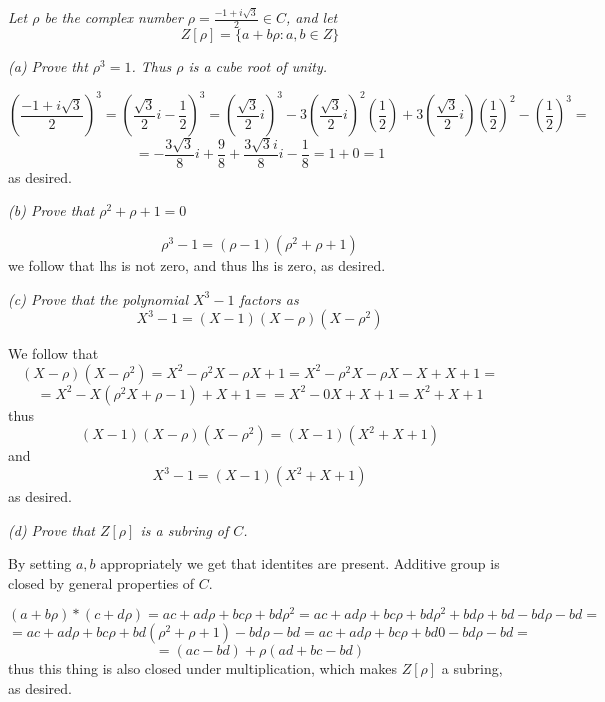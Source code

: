 \documentclass[11pt,oneside,titlepage]{book}
\newcommand{\set}[1]{\{ #1 \}}
\begin{document}
\subsection{}

\textit{Let $\rho$ be the complex number $\rho = \frac{-1 + i\sqrt{3}}{2} \in C$, and let
  $$Z[\rho] = \set{a + b\rho: a, b \in Z}$$}

\textit{(a) Prove tht $\rho^3 = 1$. Thus $\rho$ is a cube root of unity.}

$$\left(\frac{-1 + i\sqrt{3}}{2}\right)^3 =
\left(\frac{\sqrt{3}}{2} i - \frac{1}{2}\right)^3 =
\left(\frac{\sqrt{3}}{2} i \right)^3 -
3 \left(\frac{\sqrt{3}}{2} i \right)^2 \left(\frac{1}{2} \right) +
3 \left(\frac{\sqrt{3}}{2} i \right) \left(\frac{1}{2}\right)^2 -
\left(\frac{1}{2}\right)^3 = $$
$$ = - \frac{3 \sqrt{3}}{8} i  + \frac{9}{8} + \frac{3 \sqrt{3} i}{8}i  - \frac{1}{8} =
1 + 0 = 1$$
as desired.

\textit{(b) Prove that $\rho^2 + \rho + 1 = 0$}

$$\rho^3 - 1 = (\rho - 1)(\rho^2 + \rho + 1)$$
we follow that lhs is not zero, and thus lhs is zero, as desired.

\textit{(c) Prove that the polynomial $X^3 - 1$ factors as
  $$X^3 - 1 = (X - 1)(X - \rho)(X - \rho^2)$$}


We follow that
$$(X - \rho) (X - \rho^2) = X^2 - \rho^2 X - \rho X + 1 = X^2 - \rho^2 X - \rho X - X + X + 1 =$$
$$ = X^2 - X(\rho^2 X+ \rho - 1) + X + 1 = = X^2 - 0X + X + 1 = X^2 + X + 1$$
thus
$$(X - 1) (X - \rho) (X - \rho^2)  = (X - 1) (X^2 + X + 1)$$
and
$$X^3 - 1 = (X - 1)(X^2 + X + 1)$$
as desired.

\textit{(d) Prove that $Z[\rho] $ is a subring of $C$.}

By setting $a, b$ appropriately we get that identites are present. Additive group is
closed by general properties of $C$.

$$(a + b \rho) * (c + d \rho) = ac + ad \rho + bc \rho + bd \rho^2 =
ac + ad \rho + bc \rho + bd \rho^2 + bd \rho + bd - bd\rho - bd = $$
$$ = ac + ad \rho + bc \rho + bd (\rho^2 + \rho + 1) - bd\rho - bd =
ac + ad \rho + bc \rho + bd 0 - bd\rho - bd =$$
$$ = (ac - bd) + \rho(ad + bc - bd)$$
thus this thing is also closed under multiplication, which makes $Z[\rho]$ a
subring, as desired.

\subsection{}
\end{document}
